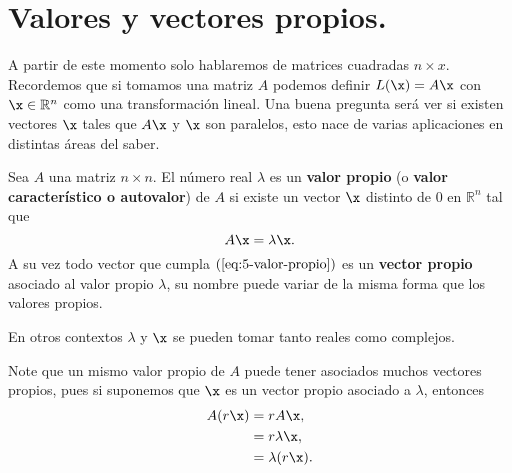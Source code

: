 \section{Valores y vectores propios.}
A partir de este momento solo hablaremos de matrices cuadradas $n\times x$. Recordemos que si tomamos una matriz $A$ podemos definir $L(\x)=A\x$ con $\x\in\mathbb{R}^{n}$ como una transformación lineal. Una buena pregunta será ver si existen vectores $\x$ tales que $A\x$ y $\x$ son paralelos, esto nace de varias aplicaciones en distintas áreas del saber.
\begin{definition}
  Sea $A$ una matriz $n\times n$. El número real $\lambda$ es un \textbf{valor propio} (o \textbf{valor característico o autovalor}) de $A$ si existe un vector $\x$ distinto de $0$ en $\mathbb{R}^{n}$ tal que
  \begin{equation}\label{eq:5-valor-propio}
    A\x=\lambda\x.
  \end{equation}
  A su vez todo vector que cumpla $(\ref{eq:5-valor-propio})$ es un \textbf{vector propio} asociado al valor propio $\lambda$, su nombre puede variar de la misma forma que los valores propios. 
\end{definition}
\begin{note}
  En otros contextos $\lambda$ y $\x$ se pueden tomar tanto reales como complejos. 
\end{note}
\begin{note}
  Note que un mismo valor propio de $A$ puede tener asociados muchos vectores propios, pues si suponemos que $\x$ es un vector propio asociado a $\lambda$, entonces 
  \begin{align*}
    A(r\x)&=rA\x,\\
    &=r\lambda\x,\\
    &=\lambda(r\x).
  \end{align*}
\end{note}
